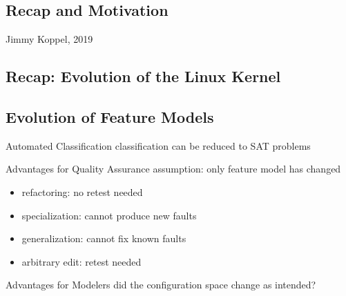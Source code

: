 \subsection{Recap and Motivation}
\begin{frame}{\insertsubsection}
	\begin{fancycolumns}[columns=3,widths={25,50},animation=none]
	\nextcolumn
		\begin{note}{Jimmy Koppel, 2019}
		\end{note}
	\nextcolumn
	\end{fancycolumns}
\end{frame}


\subsection{Recap: Evolution of the Linux Kernel}

\subsection{Evolution of Feature Models}
\begin{frame}{\myframetitle{} \mytitlesource{\reasoningfme}}
	\begin{fancycolumns}
		\pause\begin{definition}{Automated Classification}
			classification can be reduced to SAT problems
		\end{definition}
	\nextcolumn
		\pause\begin{note}{Advantages for Quality Assurance}
			assumption: only feature model has changed
			\begin{itemize}
				\item refactoring: no retest needed
				\item specialization: cannot produce new faults
				\item generalization: cannot fix known faults
				\item arbitrary edit: retest needed
			\end{itemize}
		\end{note}
		\pause\begin{note}{Advantages for Modelers}
			did the configuration space change as intended?
		\end{note}
	\end{fancycolumns}
\end{frame}


